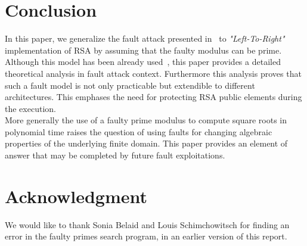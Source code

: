 \documentclass{article}
\begin{document}
\section{Conclusion}
In this paper, we generalize the fault attack presented in~\cite{77} to \textit{"Left-To-Right"} implementation of RSA by assuming that the faulty modulus can be prime. Although this model has been already used~\cite{67}, this  paper provides a detailed theoretical analysis in fault attack context. Furthermore this analysis proves that such a fault model is not only practicable but extendible to different architectures. This emphases the need for protecting RSA public elements during the execution.\\
\indent
More generally the use of a faulty prime modulus to compute square
roots in polynomial time raises the question of using faults for
changing algebraic properties of the underlying finite domain. 
This paper provides an element of answer that may be completed by
future fault exploitations.

\section*{Acknowledgment}
We would like to thank Sonia Belaid and Louis Schimchowitsch for
finding an error in the faulty primes search program, in an earlier
version of this report.


\end{document}

